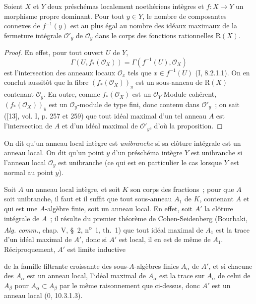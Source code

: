 \begin{proposition}[4.3.5]
\label{III.4.3.5-fr}
Soient $X$ et $Y$ deux préschémas localement noethériens intègres et
$f:X\to Y$ un morphisme propre dominant. Pour tout $y\in Y$, le nombre de
composantes connexes de $f^{-1}(y)$ est au plus égal au nombre des idéaux
maximaux de la fermeture intégrale $\mathcal O'_y$ de $\mathcal O_y$ dans le
corps des fonctions rationnelles $\mathrm R(X)$.
\end{proposition}

\begin{proof}
En effet, pour tout ouvert $U$ de $Y$,
\[
\Gamma(U,f_*(\mathcal O_X))=\Gamma(f^{-1}(U),\mathcal O_X)
\]
est l'intersection des anneaux locaux $\mathcal O_x$ tels que
$x\in f^{-1}(U)$ (I, 8.2.1.1). On en conclut aussitôt que la fibre
$(f_*(\mathcal O_X))_y$ est un sous-anneau de $\mathrm R(X)$ contenant
$\mathcal O_y$. En outre, comme $f_*(\mathcal O_X)$ est un
$\mathcal O_Y$-Module cohérent, $(f_*(\mathcal O_X))_y$ est un
$\mathcal O_y$-module de type fini, donc contenu dans $\mathcal O'_y$~; on
sait ([13], vol. I, p. 257 et 259) que tout idéal maximal d'un tel anneau
$A$ est l'intersection de $A$ et d'un idéal maximal de $\mathcal O'_y$,
d'où la proposition.
\end{proof}

\begin{definition}[4.3.6]
\label{III.4.3.6-fr}
On dit qu'un anneau local intègre est \emph{unibranche} si sa clôture
intégrale est un anneau local. On dit qu'un point $y$ d'un préschéma intègre
$Y$ est unibranche si l'anneau local $\mathcal O_y$ est unibranche (ce qui
est en particulier le cas lorsque $Y$ est normal au point $y$).
\end{definition}

Soit $A$ un anneau local intègre, et soit $K$ son corps des fractions~; pour
que $A$ soit unibranche, il faut et il suffit que tout sous-anneau $A_1$ de
$K$, contenant $A$ et qui est une $A$-algèbre finie, soit un anneau local.
En effet, soit $A'$ la clôture intégrale de $A$~; il résulte du premier
théorème de Cohen-Seidenberg (Bourbaki, \emph{Alg. comm.}, chap. V, \S~2,
n\textsuperscript{o}~1, th.~1) que tout idéal maximal de $A_1$ est la trace
d'un idéal maximal de $A'$, donc si $A'$ est local, il en est de même de
$A_1$. Réciproquement, $A'$ est limite inductive


de la famille filtrante croissante des sous-$A$-algèbres finies $A_\alpha$
de $A'$, et si chacune des $A_\alpha$ est un anneau local, l'idéal maximal
de $A_\alpha$ est la trace sur $A_\alpha$ de celui de $A_\beta$ pour
$A_\alpha\subset A_\beta$ par le même raisonnement que ci-dessus, donc $A'$
est un anneau local (0, 10.3.1.3).

